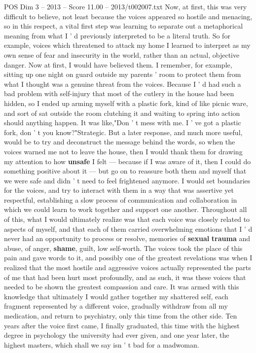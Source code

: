 \begin{textsample}{POS Dim 3 – 2013 – Score 11.00 – 2013/t002007.txt}
Now, at first, this was very difficult to believe, not least because the voices appeared so hostile and menacing, so in this respect, a vital first step was learning to separate out a metaphorical meaning from what I ' d previously interpreted to be a literal truth.
So for example, voices which threatened to attack my home I learned to interpret as my own sense of fear and insecurity in the world, rather than an actual, objective danger.
Now at first, I would have believed them.
I remember, for example, sitting up one night on guard outside my parents ' room to protect them from what I thought was a genuine threat from the voices.
Because I ' d had such a bad problem with self-injury that most of the cutlery in the house had been hidden, so I ended up arming myself with a plastic fork, kind of like picnic ware, and sort of sat outside the room clutching it and waiting to spring into action should anything happen.
It was like,"Don ' t mess with me.
I ' ve got a plastic fork, don ' t you know?"Strategic.
But a later response, and much more useful, would be to try and deconstruct the message behind the words, so when the voices warned me not to leave the house, then I would thank them for drawing my attention to how \textbf{unsafe} I felt — because if I was aware of it, then I could do something positive about it — but go on to reassure both them and myself that we were safe and didn ' t need to feel frightened anymore.
I would set boundaries for the voices, and try to interact with them in a way that was assertive yet respectful, establishing a slow process of communication and collaboration in which we could learn to work together and support one another.
Throughout all of this, what I would ultimately realize was that each voice was closely related to aspects of myself, and that each of them carried overwhelming emotions that I ' d never had an opportunity to process or resolve, memories of \textbf{sexual} \textbf{trauma} and abuse, of anger, \textbf{shame}, guilt, low self-worth.
The voices took the place of this pain and gave words to it, and possibly one of the greatest revelations was when I realized that the most hostile and aggressive voices actually represented the parts of me that had been hurt most profoundly, and as such, it was these voices that needed to be shown the greatest compassion and care.
It was armed with this knowledge that ultimately I would gather together my shattered self, each fragment represented by a different voice, gradually withdraw from all my medication, and return to psychiatry, only this time from the other side.
Ten years after the voice first came, I finally graduated, this time with the highest degree in psychology the university had ever given, and one year later, the highest masters, which shall we say isn ' t bad for a madwoman.

\end{textsample}
